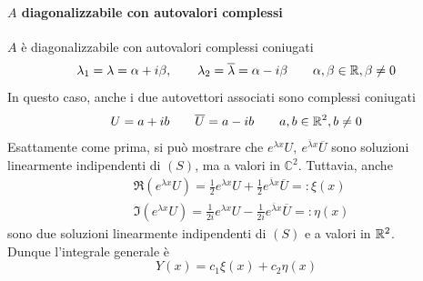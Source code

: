 \paragraph{$A$ diagonalizzabile con autovalori complessi}
$A$ è diagonalizzabile con autovalori complessi coniugati
\begin{equation}
    \lambda_1=\lambda= \alpha+ i\beta, \qquad
    \lambda_2=\overline{\lambda}= \alpha- i\beta \qquad \alpha, \beta \in \mathbb{R}, \beta \neq0
\end{equation}
In questo caso, anche i due autovettori associati sono complessi coniugati
\begin{equation}
    U=a+ib \qquad \overline{U}=a-ib \qquad a, b \in \mathbb{R}^2, b \neq 0
\end{equation}
Esattamente come prima, si può mostrare che $e^{\lambda x}U,\ e^{\overline{\lambda}x}\overline{U}$
sono soluzioni linearmente indipendenti di $(S)$, ma a valori in $\mathbb{C}^2$. Tuttavia, anche
\begin{align}
    &\Re\left(e^{\lambda x}U\right)= \frac{1}{2}e^{\lambda x}U+\frac{1}{2}e^{\overline{\lambda} x}\overline{U} =: \xi(x)\\
    &\Im\left(e^{\lambda x}U\right)= \frac{1}{2i}e^{\lambda x}U-\frac{1}{2i}e^{\overline{\lambda} x}\overline{U} =: \eta(x)
\end{align}
sono due soluzioni linearmente indipendenti di $(S)$ e a valori in $\mathbb{R}^2$.\\
Dunque l'integrale generale è
\begin{equation}
        Y(x)= c_1 \xi(x) + c_2 \eta(x)
\end{equation}
